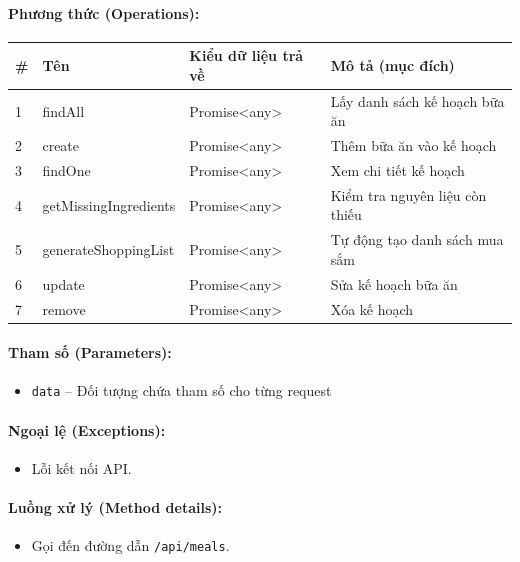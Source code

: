 \documentclass[12pt,a4paper]{article}
\begin{document}
\paragraph{Phương thức (Operations):}
\begin{longtable}{|p{0.6cm}|p{5.0cm}|p{2.8cm}|p{5.4cm}|}
\hline
\textbf{\#} & \textbf{Tên} & \textbf{Kiểu dữ liệu trả về} & \textbf{Mô tả (mục đích)} \\ \hline
\endhead
1 & findAll & Promise\textless{}any\textgreater{} & Lấy danh sách kế hoạch bữa ăn \\ \hline
2 & create & Promise\textless{}any\textgreater{} & Thêm bữa ăn vào kế hoạch \\ \hline
3 & findOne & Promise\textless{}any\textgreater{} & Xem chi tiết kế hoạch \\ \hline
4 & getMissingIngredients & Promise\textless{}any\textgreater{} & Kiểm tra nguyên liệu còn thiếu \\ \hline
5 & generateShoppingList & Promise\textless{}any\textgreater{} & Tự động tạo danh sách mua sắm \\ \hline
6 & update & Promise\textless{}any\textgreater{} & Sửa kế hoạch bữa ăn \\ \hline
7 & remove & Promise\textless{}any\textgreater{} & Xóa kế hoạch \\ \hline
\end{longtable}

\paragraph{Tham số (Parameters):}
\begin{itemize}[leftmargin=*]
    \item \texttt{data} – Đối tượng chứa tham số cho từng request
\end{itemize}


\paragraph{Ngoại lệ (Exceptions):}
\begin{itemize}[leftmargin=*]
    \item Lỗi kết nối API.
\end{itemize}


\paragraph{Luồng xử lý (Method details):}
\begin{itemize}[leftmargin=*]
    \item Gọi đến đường dẫn \texttt{/api/meals}.
\end{itemize}
\end{document}
